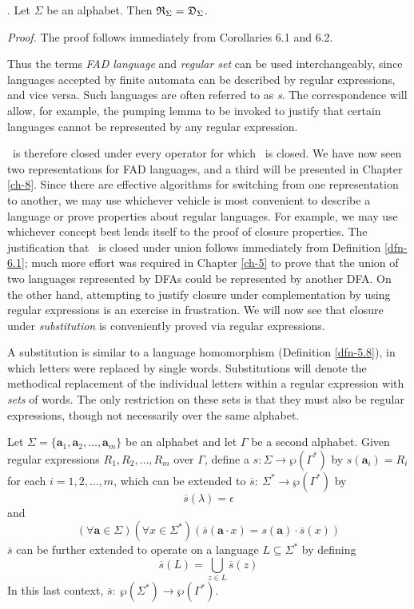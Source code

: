 \begin{thm}\label{thm-6.5}
\textbf{}. Let $\Sigma$ be an alphabet. Then $\mathfrak{R}_\Sigma = \mathfrak{D}_\Sigma$.

\emph{Proof.} The proof follows immediately from Corollaries 6.1 and 6.2.
\end{thm}

Thus the terms \emph{FAD language} and \emph{regular set} can be used
interchangeably, since languages accepted by finite automata can be described by
regular expressions, and vice versa. Such languages are often referred to as
\emph{s}. The correspondence will allow, for example,
the pumping lemma to be invoked to justify that certain languages cannot be
represented by any regular expression.

\RSIG\ is therefore closed under every operator for which \DSIG\ is closed. We
have now seen two representations for FAD languages, and a third will be
presented in Chapter \ref{ch-8}. Since there are effective algorithms for switching from
one representation to another, we may use whichever vehicle is most convenient
to describe a language or prove properties about regular languages. For example,
we may use whichever concept best lends itself to the proof of closure
properties. The justification that \RSIG\ is closed under union follows
immediately from Definition \ref{dfn-6.1}; much more effort was required in Chapter \ref{ch-5} to
prove that the union of two languages represented by DFAs could be represented
by another DFA. On the other hand, attempting to justify closure under
complementation by using regular expressions is an exercise in frustration. We
will now see that closure under \emph{substitution} is conveniently
proved via regular expressions.

A substitution is similar to a language homomorphism (Definition \ref{dfn-5.8}), in
which letters were replaced by single words. Substitutions will denote the
methodical replacement of the individual letters within a regular expression
with \emph{sets} of words. The only restriction on these sets is that they must
also be regular expressions, though not necessarily over the same alphabet.

\begin{dfn}\label{dfn-6.5}
Let $\Sigma=\{\pmb{a}_1,\pmb{a}_2,\ldots,\pmb{a}_m\}$ be an alphabet and let
$\Gamma$ be a second alphabet. Given regular expressions $R_1,R_2,\ldots,R_m$
over $\Gamma$, define a \emph{} $s$$:\Sigma
\rightarrow \wp(\Gamma^*)$ by $s(\pmb{a}_i) = R_i$ for each $i=1,2,\ldots,m$,
which can be extended to $\overline{s}:\ \Sigma^* \rightarrow \wp(\Gamma^*)$ by
\[ \overline{s}(\lambda) = \epsilon \]
and
\[ (\forall\pmb{a}\in\Sigma)(\forall x \in\Sigma^*)(\overline{s}(\pmb{a}\cdot x)
	= s(\pmb{a})\cdot \overline{s}(x)) \]
$\overline{s}$ can be further extended to operate on a language $L \subseteq
\Sigma^*$ by defining
\[ \overline{s}(L) = \bigcup\limits_{z\in L} \overline{s}(z) \]
In this last context, $\overline{s}:\ \wp(\Sigma^*) \rightarrow \wp(\Gamma^*)$.
\end{dfn}


